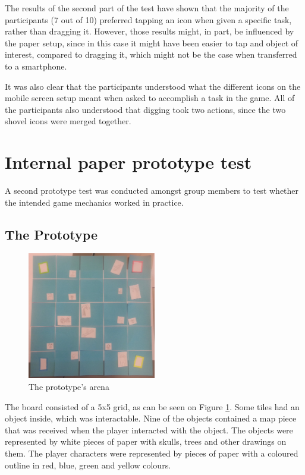 The results of the second part of the test have shown that the majority of the participants (7 out of 10) preferred tapping an icon when given a specific task, rather than dragging it. However, those results might, in part, be influenced by the paper setup, since in this case it might have been easier to tap and object of interest, compared to dragging it, which might not be the case when transferred to a smartphone. 

It was also clear that the participants understood what the different icons on the mobile screen setup meant when asked to accomplish a task in the game. All of the participants also understood that digging took two actions, since the two shovel icons were merged together. 

\section{Internal paper prototype test}
A second prototype test was conducted amongst group members to test whether the intended game mechanics worked in practice.

\subsection{The Prototype}
\begin{figure}[h] 
\centering 
\includegraphics[width=0.5\textwidth]{figures/PPtestArena}
\caption{The prototype's arena} \label{fig:PPtest1}
\end{figure}
The board consisted of a 5x5 grid, as can be seen on Figure \ref{fig:PPtest1}. Some tiles had an object inside, which was interactable. Nine of the objects contained a map piece that was received when the player interacted with the object. The objects were represented by white pieces of paper with skulls, trees and other drawings on them. The player characters were represented by pieces of paper with a coloured outline in red, blue, green and yellow colours.

